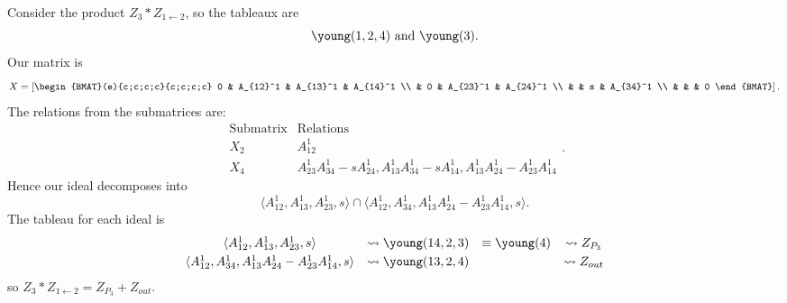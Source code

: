\documentclass{article} %
\begin{document}
\begin{example}
Consider the product $Z_3 * Z_{1 \leftarrow 2}$, so the tableaux are 
\[
\young(1,2,4) \text{ and } \young(3).
\]
Our matrix is 
\[
X = \left[\begin{BMAT}(e){c;c;c;c}{c;c;c;c}
    0 & A_{12}^1 & A_{13}^1 & A_{14}^1 \\
     & 0 & A_{23}^1 & A_{24}^1 \\
     & & s & A_{34}^1 \\
     & & & 0
\end{BMAT}
\right].
\]
The relations from the submatrices are:
\[
\begin{array}{c|c}
    \text{Submatrix} & \text{Relations} \\ \hline
    X_2 & A_{12}^1 \\
    X_4 & A_{23}^1A_{34}^1 - sA_{24}^1, A_{13}^1A_{34}^1 - sA_{14}^1, A_{13}^1A_{24}^1 - A_{23}^1A_{14}^1 
\end{array}.
\]
Hence our ideal decomposes into 
\[
\langle A_{12}^1,A_{13}^1,A_{23}^1,s \rangle \cap \langle A_{12}^1,A_{34}^1,A_{13}^1A_{24}^1-A_{23}^1A_{14}^1,s \rangle.
\]
The tableau for each ideal is
\[\begin{array}{cccc}\vspace{1mm}
    \langle A_{12}^1,A_{13}^1,A_{23}^1,s \rangle &\leadsto \young(14,2,3) &\equiv \young(4) &\leadsto Z_{P_3} \\ 
    \langle A_{12}^1,A_{34}^1,A_{13}^1A_{24}^1-A_{23}^1A_{14}^1,s \rangle &\leadsto \young(13,2,4) & &\leadsto Z_{out}
\end{array}
\]
so $Z_3 * Z_{1 \leftarrow 2} = Z_{P_3} + Z_{out}$.
\end{example}
\end{document}
